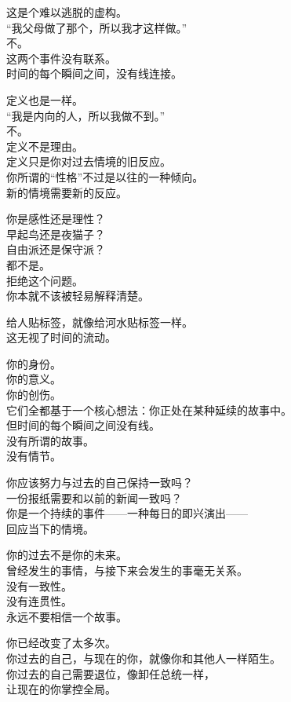 \documentclass[
]{article}
\begin{document}
这是个难以逃脱的虚构。\\
``我父母做了那个，所以我才这样做。''\\
不。\\
这两个事件没有联系。\\
时间的每个瞬间之间，没有线连接。

定义也是一样。\\
``我是内向的人，所以我做不到。''\\
不。\\
定义不是理由。\\
定义只是你对过去情境的旧反应。\\
你所谓的``性格''不过是以往的一种倾向。\\
新的情境需要新的反应。

你是感性还是理性？\\
早起鸟还是夜猫子？\\
自由派还是保守派？\\
都不是。\\
拒绝这个问题。\\
你本就不该被轻易解释清楚。

给人贴标签，就像给河水贴标签一样。\\
这无视了时间的流动。

你的身份。\\
你的意义。\\
你的创伤。\\
它们全都基于一个核心想法：你正处在某种延续的故事中。\\
但时间的每个瞬间之间没有线。\\
没有所谓的故事。\\
没有情节。

你应该努力与过去的自己保持一致吗？\\
一份报纸需要和以前的新闻一致吗？\\
你是一个持续的事件------一种每日的即兴演出------\\
回应当下的情境。

你的过去不是你的未来。\\
曾经发生的事情，与接下来会发生的事毫无关系。\\
没有一致性。\\
没有连贯性。\\
永远不要相信一个故事。

你已经改变了太多次。\\
你过去的自己，与现在的你，就像你和其他人一样陌生。\\
你过去的自己需要退位，像卸任总统一样，\\
让现在的你掌控全局。
\end{document}
